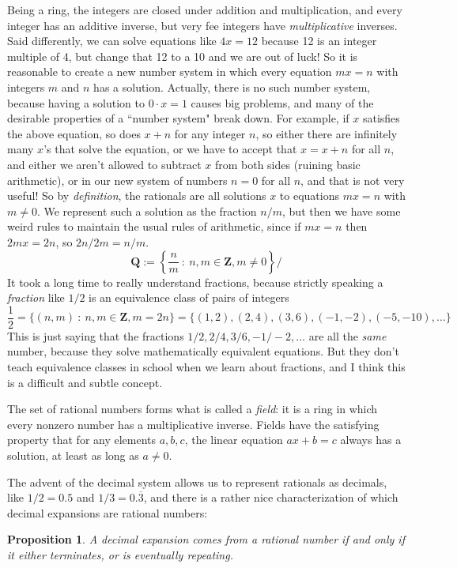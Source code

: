\documentclass[11pt]{amsart}
\newcommand*{\Z}{\ensuremath{\mathbf{Z}}}
\newcommand*{\Q}{\ensuremath{\mathbf{Q}}}
\theoremstyle{plain}
\newtheorem{proposition}[theorem]{Proposition}
\theoremstyle{definition}
\theoremstyle{remark}
\numberwithin{theorem}{section}
\numberwithin{equation}{section}
\begin{document}
Being a ring, the integers are closed under addition and multiplication, and every integer has an additive inverse, but very fee integers
have {\em multiplicative} inverses.  Said differently, we can solve equations like $4x = 12$ because 12 is an integer multiple of 4, 
but change that 12 to a 10 and we are out of luck!  So it is reasonable to create a new number system in which every equation $mx=n$
with integers $m$ and $n$ has a solution.  Actually, there is no such number system, because having a solution to $0\cdot x = 1$
causes big problems, and many of the desirable properties of a ``number system" break down.  For example, if $x$ satisfies the above equation,
so does $x+n$ for any integer $n$, so either there are infinitely many $x$'s that solve the equation, or we have to accept that $x=x+n$ for all $n$,
and either we aren't allowed to subtract $x$ from both sides (ruining basic arithmetic), or in our new system of numbers $n=0$ for all $n$,
and that is not very useful!  So by {\em definition}, the rationals are all solutions $x$ to equations $mx=n$ with $m\neq 0$.  We
represent such a solution as the fraction $n/m$, but then we have some weird rules to maintain the usual rules of arithmetic,
since if $mx=n$ then $2mx = 2n$, so $2n/2m = n/m$.  
$$
	\Q:=\left\{\frac{n}{m}\ :\ n,m\in \Z, m\neq 0\right\}/
$$
It took a long time to really understand fractions, because strictly speaking a {\em fraction} like $1/2$ is an equivalence class of pairs of integers
$$
	\frac{1}{2} = \{ (n,m)\ :\ n,m\in \Z, m=2n \} = \{ (1,2), (2,4), (3,6), (-1,-2), (-5,-10),\ldots\}
$$
This is just saying that the fractions ${1/2}, 2/4, 3/6, -1/-2,\ldots$ are all the {\em same} number, because they solve mathematically equivalent
equations.  But they don't teach equivalence classes in school when we learn about fractions, and I think this is a difficult and subtle concept.

The set of rational numbers forms what is called a {\em field}: it is a ring in which every nonzero number has a multiplicative inverse.
Fields have the satisfying property that for any elements $a,b,c$, the linear equation $ax+b=c$ always has a solution, at least as long
as $a\neq 0$.

The advent of the decimal system allows us to represent rationals as decimals, like $1/2 = 0.5$ and $1/3 = 0.\overline{3}$,
and there is a rather nice characterization of which decimal expansions are rational numbers: 

\begin{proposition}\label{rat}
	A decimal expansion comes from a rational number if and only if it either terminates, or is eventually repeating.
\end{proposition}
\end{document}
